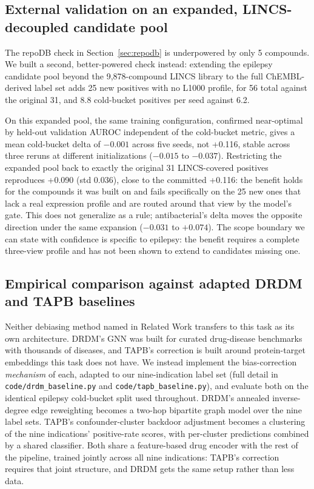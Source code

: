 \documentclass{llncs}
\begin{document}
\subsection{External validation on an expanded, LINCS-decoupled candidate pool}
\label{sec:expanded}
The repoDB check in Section~\ref{sec:repodb} is underpowered by only 5 compounds. We built a second, better-powered check instead: extending the epilepsy candidate pool beyond the 9{,}878-compound LINCS library to the full ChEMBL-derived label set adds 25 new positives with no L1000 profile, for 56 total against the original 31, and 8.8 cold-bucket positives per seed against 6.2.

On this expanded pool, the same training configuration, confirmed near-optimal by held-out validation AUROC independent of the cold-bucket metric, gives a mean cold-bucket delta of $-0.001$ across five seeds, not +0.116, stable across three reruns at different initializations ($-0.015$ to $-0.037$). Restricting the expanded pool back to exactly the original 31 LINCS-covered positives reproduces +0.090 (std 0.036), close to the committed +0.116: the benefit holds for the compounds it was built on and fails specifically on the 25 new ones that lack a real expression profile and are routed around that view by the model's gate. This does not generalize as a rule; antibacterial's delta moves the opposite direction under the same expansion ($-0.031$ to $+0.074$). The scope boundary we can state with confidence is specific to epilepsy: the benefit requires a complete three-view profile and has not been shown to extend to candidates missing one.

\subsection{Empirical comparison against adapted DRDM and TAPB baselines}
\label{sec:baselines}
Neither debiasing method named in Related Work transfers to this task as its own architecture. DRDM's GNN was built for curated drug-disease benchmarks with thousands of diseases, and TAPB's correction is built around protein-target embeddings this task does not have. We instead implement the bias-correction \emph{mechanism} of each, adapted to our nine-indication label set (full detail in \texttt{code/drdm\_baseline.py} and \texttt{code/tapb\_baseline.py}), and evaluate both on the identical epilepsy cold-bucket split used throughout. DRDM's annealed inverse-degree edge reweighting becomes a two-hop bipartite graph model over the nine label sets. TAPB's confounder-cluster backdoor adjustment becomes a clustering of the nine indications' positive-rate scores, with per-cluster predictions combined by a shared classifier. Both share a feature-based drug encoder with the rest of the pipeline, trained jointly across all nine indications: TAPB's correction requires that joint structure, and DRDM gets the same setup rather than less data.
\end{document}
